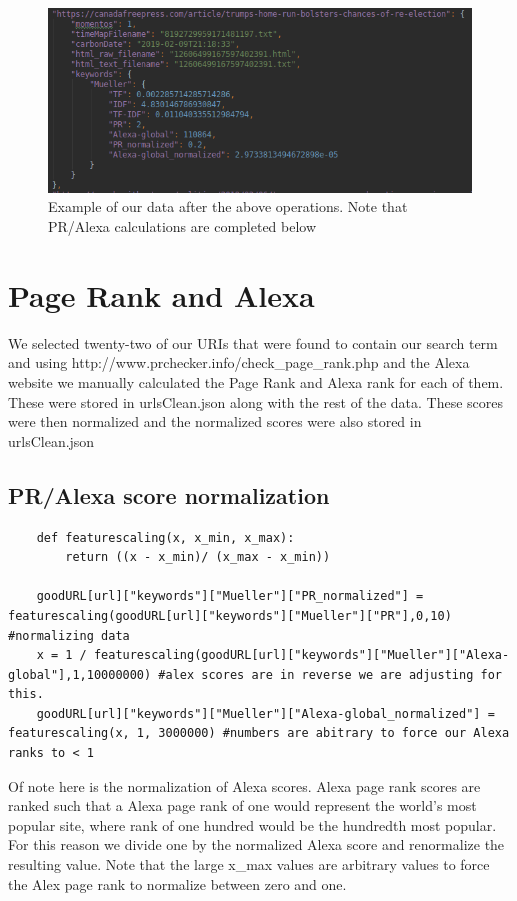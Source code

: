 \documentclass[11pt]{article}
\begin{document}
	\begin{figure}[h!]
		\includegraphics[scale=0.5]{resources/tf-idf-json.png}
		\caption{Example of our data after the above operations. Note that PR/Alexa calculations are completed below}
	\end{figure}
	\section{Page Rank and Alexa}
	\hspace{10mm} We selected twenty-two of our URIs that were found to contain our search term and using http://www.prchecker.info/check\_page\_rank.php and the Alexa website we manually calculated the Page Rank and Alexa rank for each of them. These were stored in urlsClean.json along with the rest of the data. These scores were then normalized and the normalized scores were also stored in urlsClean.json
	\subsection{PR/Alexa score normalization}
	\begin{lstlisting}
	def featurescaling(x, x_min, x_max):
	    return ((x - x_min)/ (x_max - x_min))
	    
	goodURL[url]["keywords"]["Mueller"]["PR_normalized"] = featurescaling(goodURL[url]["keywords"]["Mueller"]["PR"],0,10) #normalizing data
	x = 1 / featurescaling(goodURL[url]["keywords"]["Mueller"]["Alexa-global"],1,10000000) #alex scores are in reverse we are adjusting for this.
	goodURL[url]["keywords"]["Mueller"]["Alexa-global_normalized"] = featurescaling(x, 1, 3000000) #numbers are abitrary to force our Alexa ranks to < 1
	\end{lstlisting}
	\hspace{10mm} Of note here is the normalization of Alexa scores. Alexa page rank scores are ranked such that a Alexa page rank of one would represent the world's most popular site, where rank of one hundred would be the hundredth most popular. For this reason we divide one by the normalized Alexa score and renormalize the resulting value. Note that the large x\_max values are arbitrary values to force the Alex page rank to normalize between zero and one. 
	  
\end{document}
